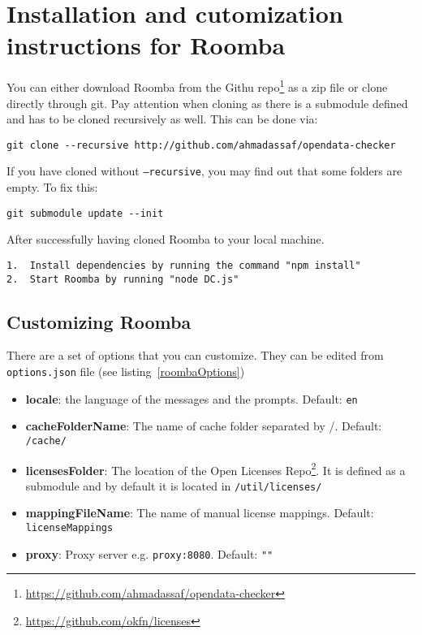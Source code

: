 \chapter{Installation and cutomization instructions for Roomba}
\label{appendix:appendixD}

You can either download Roomba from the Githu repo\footnote{\url{https://github.com/ahmadassaf/opendata-checker}} as a zip file or clone directly through git. Pay attention when cloning as there is a submodule defined and has to be cloned recursively as well. This can be done via:

\begin{verbatim}
git clone --recursive http://github.com/ahmadassaf/opendata-checker
\end{verbatim}

If you have cloned without \texttt{--recursive}, you may find out that some folders are empty. To fix this:
\begin{verbatim}
git submodule update --init
\end{verbatim}

After successfully having cloned Roomba to your local machine.
\begin{verbatim}
1.	Install dependencies by running the command "npm install"
2.	Start Roomba by running "node DC.js"
\end{verbatim}

\section{Customizing Roomba}

There are a set of options that you can customize. They can be edited from \texttt{options.json} file (see listing~\ref{roombaOptions})




\begin{itemize}
	\item \textbf{locale}: the language of the messages and the prompts. Default: \texttt{en}
	\item \textbf{cacheFolderName}: The name of cache folder separated by /. Default: \texttt{/cache/}
	\item \textbf{licensesFolder}: The location of the Open Licenses Repo\footnote{\url{https://github.com/okfn/licenses}}. It is defined as a submodule and by default it is located in \texttt{/util/licenses/}
	\item \textbf{mappingFileName}: The name of manual license mappings. Default: \texttt{licenseMappings}
	\item \textbf{proxy}: Proxy server e.g. \texttt{proxy:8080}. Default: \texttt{""}
\end{itemize}

